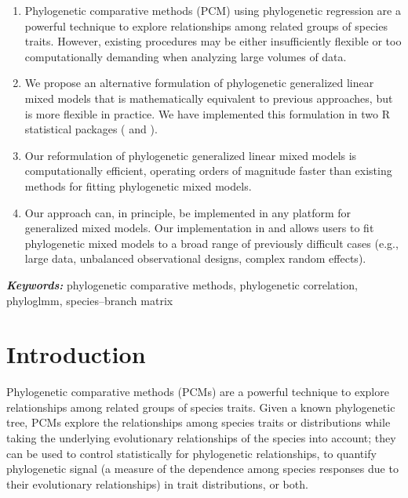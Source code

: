 \documentclass[12pt]{article}
\providecommand{\keywords}[1]{\textbf{\textit{Keywords:}} #1}
\begin{document}
\begin{enumerate}
\item{Phylogenetic comparative methods (PCM) using phylogenetic regression are a powerful technique to explore relationships among related groups of species traits. However, existing procedures may be either insufficiently flexible or too computationally demanding when analyzing large volumes of data.}
\item{We propose an alternative formulation of phylogenetic generalized linear mixed models that is mathematically equivalent to previous approaches, but is more flexible in practice. We have implemented this formulation in two R statistical packages ( and ).}
\item{Our reformulation of phylogenetic generalized linear mixed models is computationally efficient, operating orders of magnitude faster than existing methods for fitting phylogenetic mixed models.}
\item{Our approach can, in principle, be implemented in any platform for generalized mixed models. Our implementation in  and  allows users to fit phylogenetic mixed models to a broad range of previously difficult cases (e.g., large data, unbalanced observational designs, complex random effects).}
\end{enumerate}



\keywords{phylogenetic comparative methods, phylogenetic correlation, phyloglmm, species--branch matrix}


\section*{Introduction}

Phylogenetic comparative methods (PCMs) are a powerful technique to explore relationships among related groups of species traits.
Given a known phylogenetic tree, PCMs explore the relationships among species traits or distributions while taking the underlying evolutionary relationships of the species into account; they can be used to control statistically for phylogenetic relationships, to quantify phylogenetic signal (a measure of the dependence among species responses due to their evolutionary relationships) in trait distributions, or both. 
\end{document}
